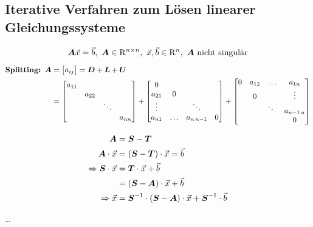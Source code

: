 \subsection{Iterative Verfahren zum Lösen linearer Gleichungssysteme}
\[\boldsymbol {A} \vec{x} = \vec{b},\ \boldsymbol {A} \in \mathrm{R}^{n\times n},\ \vec{x},\vec{b} \in \mathrm{R}^n,\ \boldsymbol {A} \text{ nicht singulär}\]

\begin{align}
	\textbf{Splitting: } \boldsymbol {A} &= \begin{bmatrix}a_{ij}\end{bmatrix} = \boldsymbol {D} + \boldsymbol {L} + \boldsymbol {U}\\
	&= \begin{bmatrix}a_{11} & & & \\ & a_{22} & &\\ & & \ddots & \\ & & & a_{nn}\end{bmatrix} +
	\begin{bmatrix}0 & & & \\ a_{21} & 0 & &\\ \vdots & & \ddots &  \\ a_{n1} & \ldots & a_{n\, n-1} & 0\end{bmatrix} +
	\begin{bmatrix}0 & a_{12} & \ldots & a_{1n} \\ & 0 & & \vdots \\ & & \ddots & a_{n-1\,n} \\ & & & 0\end{bmatrix}
\end{align}

\begin{align}
	\boldsymbol {A} &= \boldsymbol {S} - \boldsymbol {T}\\
	\boldsymbol {A} \cdot \vec{x} &= \left( \boldsymbol {S} - \boldsymbol {T} \right) \cdot \vec{x} = \vec{b}\\
	\Rightarrow \boldsymbol {S} \cdot \vec{x} &= \boldsymbol {T} \cdot \vec{x} + \vec{b}\\
	&= \left( \boldsymbol {S} - \boldsymbol {A} \right) \cdot \vec{x} + \vec{b}\\
	\Rightarrow \vec{x} &= \boldsymbol {S}^{-1} \cdot \left( \boldsymbol {S} - \boldsymbol {A} \right) \cdot \vec{x} + \boldsymbol {S}^{-1} \cdot \vec{b}
\end{align}

\ldots

